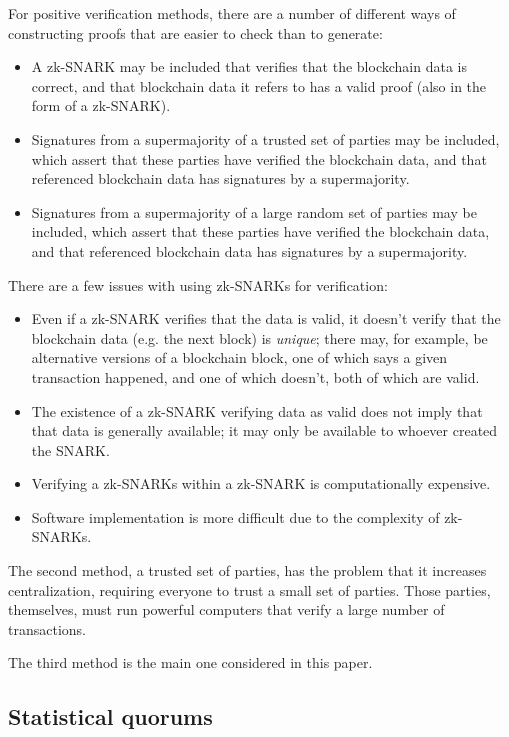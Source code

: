 \documentclass{article}
\begin{document}
For positive verification methods, there are a number of different ways of constructing proofs that are easier to check than to generate:

\begin{itemize}
  \item A zk-SNARK may be included that verifies that the blockchain data is correct, and that blockchain data it refers to has a valid proof (also in the form of a zk-SNARK).
  \item Signatures from a supermajority of a trusted set of parties may be included, which assert that these parties have verified the blockchain data, and that referenced blockchain data has signatures by a supermajority.
  \item Signatures from a supermajority of a large random set of parties may be included, which assert that these parties have verified the blockchain data, and that referenced blockchain data has signatures by a supermajority.
\end{itemize}

There are a few issues with using zk-SNARKs for verification:

\begin{itemize}
  \item Even if a zk-SNARK verifies that the data is valid, it doesn't verify that the blockchain data (e.g. the next block) is \emph{unique}; there may, for example, be alternative versions of a blockchain
        block, one of which says a given transaction happened, and one of which doesn't, both of which are valid.
  \item The existence of a zk-SNARK verifying data as valid does not imply that that data is generally available; it may only be available to whoever created the SNARK.
  \item Verifying a zk-SNARKs within a zk-SNARK is computationally expensive.
  \item Software implementation is more difficult due to the complexity of zk-SNARKs.
\end{itemize}

The second method, a trusted set of parties, has the problem that it increases centralization, requiring everyone to trust a small set of parties.  Those parties, themselves, must run powerful computers
that verify a large number of transactions.

The third method is the main one considered in this paper.

\subsection{Statistical quorums}
\end{document}
